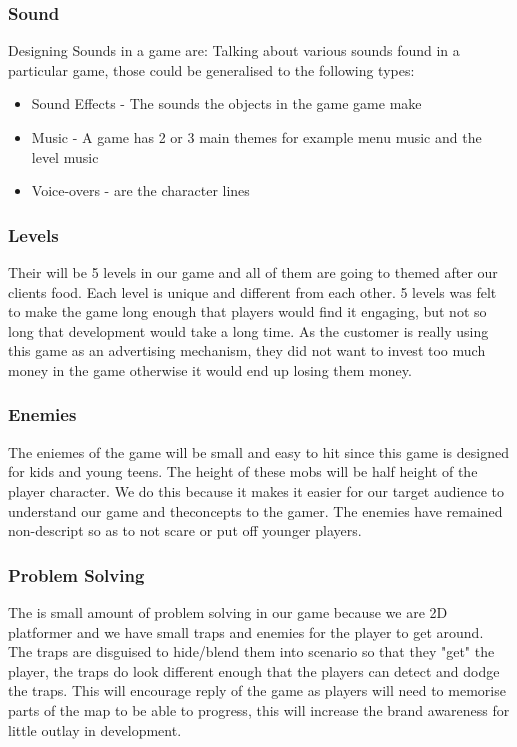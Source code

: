 \documentclass{article}
\begin{document}
\subsubsection{Sound}
Designing Sounds in a game are:
Talking about various sounds found in a particular game, those could be generalised to the following types: 
\begin{itemize}
	\item Sound Effects - The sounds the objects in the game game make
	\item Music -  A game has 2 or 3 main themes for example menu music and the level music
	\item Voice-overs - are the character lines
\end{itemize}

\subsubsection{Levels}
Their will be 5 levels in our game and all of them are going to themed after our clients food. Each level is unique and different from each other. 5 levels was felt to make the game long enough that players would find it engaging, but not so long that development would take a long time. As the customer is really using this game as an advertising mechanism, they did not want to invest too much money in the game otherwise it would end up losing them money.

\subsubsection{Enemies}
The eniemes of the game will be small and easy to hit since this game is designed for kids and young teens. The height of these mobs will be half height of the player character. We do this because it makes it easier for our target audience to understand our game and theconcepts to the gamer. The enemies have remained non-descript so as to not scare or put off younger players. 


\subsubsection{Problem Solving}
The is small amount of problem solving in our game because we are 2D platformer and we have small traps and enemies for the player to get around. The traps are disguised to hide/blend them into scenario so that they "get" the player, the traps do look different enough that the players can detect and dodge the traps. This will encourage reply of the game as players will need to memorise parts of the map to be able to progress, this will increase the brand awareness for little outlay in development.
\end{document}
